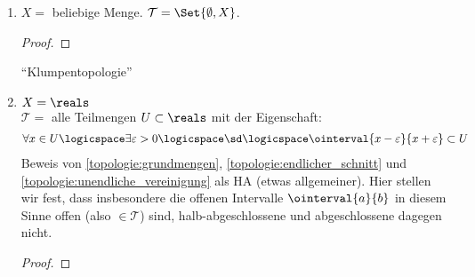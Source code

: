 \begin{beispiele}
    \begin{enumerate}
        \item \label{klumpentopologie}\( X= \) beliebige Menge. \( \mathcal{T}=\Set{\emptyset, X} \).
        \begin{proof}
        \end{proof}
        \enquote{Klumpentopologie}
        
        \item \label{standard-topologie}\( X=\reals \)\\
        \( \mathcal{T}= \) alle Teilmengen \( U\subset \reals \) mit der Eigenschaft:
        \begin{align*}
            \forall  x\in U\logicspace\exists\varepsilon>0\logicspace\text{\sd}\logicspace \ointerval{x-\varepsilon}{x+\varepsilon}\subset U
        \end{align*}
        Beweis von \ref{topologie:grundmengen}, \ref{topologie:endlicher_schnitt} und \ref{topologie:unendliche_vereinigung} als HA (etwas allgemeiner).
        Hier stellen wir fest, dass insbesondere die offenen Intervalle \( \ointerval{a}{b} \) in diesem Sinne offen (also \( \in \mathcal{T} \)) sind, halb-abgeschlossene und abgeschlossene dagegen nicht.
        \begin{proof}
            

\end{proof}
\end{enumerate}
\end{beispiele}

